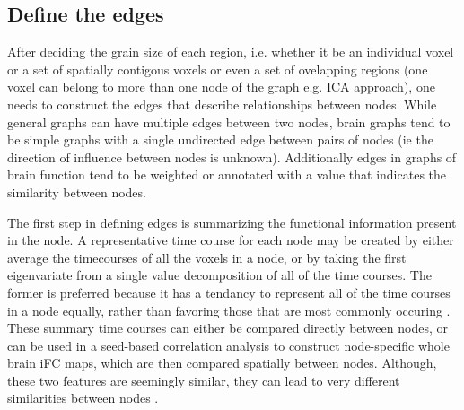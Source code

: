 \subsection*{Define the edges}
After deciding the grain size of each region, i.e. whether it be an individual voxel or a set of spatially contigous voxels or even a set of ovelapping regions (one voxel can belong to more than one node of the graph e.g. ICA approach), one needs to construct the edges that describe relationships between nodes. While general graphs can have multiple edges between two nodes, brain graphs tend to be simple graphs with a single undirected edge between pairs of nodes (ie the direction of influence between nodes is unknown). Additionally edges in graphs of brain function tend to be weighted or annotated with a value that indicates the similarity between nodes. 

The first step in defining edges is summarizing the functional information present in the node. A representative time course for each node may be created by either average the timecourses of all the voxels in a node, or by taking the first eigenvariate from a single value decomposition of all of the time courses. The former is preferred because it has a tendancy to represent all of the time courses in a node equally, rather than favoring those that are most commonly occuring \cite{craddock2012}. These summary time courses can either be compared directly between nodes, or can be used in a seed-based correlation analysis to construct node-specific whole brain iFC maps, which are then compared spatially between nodes. Although, these two features are seemingly similar, they can lead to very different similarities between nodes \cite{craddock2012}. 

